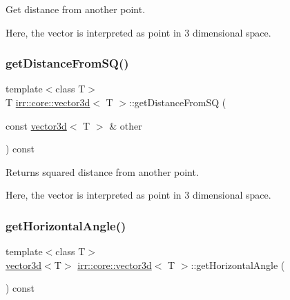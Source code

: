 Get distance from another point. 

Here, the vector is interpreted as point in 3 dimensional space. \mbox{\label{classirr_1_1core_1_1vector3d_a01ba1b5d0cbf1b47245304e62c7fb5a1}} 
\subsubsection{\texorpdfstring{get\+Distance\+From\+S\+Q()}{getDistanceFromSQ()}}
{\footnotesize\ttfamily template$<$class T$>$ \\
T \hyperlink{classirr_1_1core_1_1vector3d}{irr\+::core\+::vector3d}$<$ T $>$\+::get\+Distance\+From\+SQ (\begin{DoxyParamCaption}\item[{const \hyperlink{classirr_1_1core_1_1vector3d}{vector3d}$<$ T $>$ \&}]{other }\end{DoxyParamCaption}) const\hspace{0.3cm}{\ttfamily [inline]}}



Returns squared distance from another point. 

Here, the vector is interpreted as point in 3 dimensional space. \mbox{\label{classirr_1_1core_1_1vector3d_a2c622aa988b4ea1d2e381632f99f8015}} 
\subsubsection{\texorpdfstring{get\+Horizontal\+Angle()}{getHorizontalAngle()}}
{\footnotesize\ttfamily template$<$class T$>$ \\
\hyperlink{classirr_1_1core_1_1vector3d}{vector3d}$<$T$>$ \hyperlink{classirr_1_1core_1_1vector3d}{irr\+::core\+::vector3d}$<$ T $>$\+::get\+Horizontal\+Angle (\begin{DoxyParamCaption}{ }\end{DoxyParamCaption}) const\hspace{0.3cm}{\ttfamily [inline]}}



